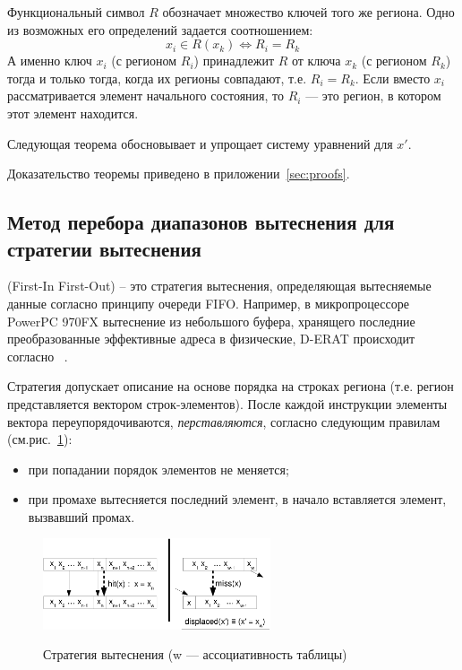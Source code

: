 Функциональный символ $R$ обозначает множество ключей того же региона. Одно из возможных его определений задается соотношением:
$$x_i \in R(x_k) \Leftrightarrow R_i = R_k$$
А именно ключ $x_i$ (с регионом $R_i$) принадлежит $R$ от ключа $x_k$ (с
регионом $R_k$) тогда и только тогда, когда их регионы совпадают, т.е. $R_i =
R_k$. Если вместо $x_i$ рассматривается элемент начального состояния, то $R_i$
--- это регион, в котором этот элемент находится.

Следующая теорема обосновывает и упрощает систему уравнений для $x'$.
\begin{theorem}\label{LRU_equation} \DiapazonLRU
\end{theorem}

Доказательство теоремы приведено в приложении~\ref{sec:proofs}.

\subsection{Метод перебора диапазонов вытеснения для стратегии
вытеснения \FIFO}

\FIFO (First-In First-Out) -- это стратегия вытеснения, определяющая
вытесняемые данные согласно принципу очереди FIFO. Например, в
микропроцессоре PowerPC 970FX вытеснение из небольшого буфера,
хранящего последние преобразованные эффективные адреса в физические,
D-ERAT происходит согласно \FIFO~\cite{PowerPC970FXUserManual}.

Стратегия \FIFO допускает описание на основе порядка на строках
региона (т.е. регион представляется вектором строк-элементов). После каждой
инструкции элементы вектора переупорядочиваются, \emph{перставляются}, согласно следующим правилам
(см.рис.~\ref{fifo1}):
\begin{itemize}
\item при попадании порядок элементов не меняется;
\item при промахе вытесняется последний элемент, в начало вставляется элемент,
вызвавший промах.
\end{itemize}

\begin{figure}[h] \center
  \includegraphics[width=0.6\textwidth]{2.theor/fifo1}\\
  \caption{Стратегия вытеснения \FIFO (w --- ассоциативность
таблицы)}\label{fifo1}
\end{figure}

